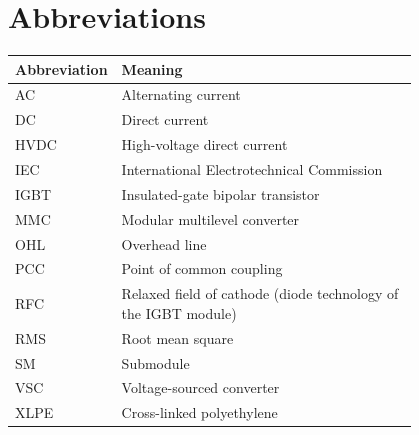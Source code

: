 \section{Abbreviations}
\label{sec:abbreviations}

\begin{longtable}{@{}l p{0.80\linewidth}@{}}
  \toprule
  \multicolumn{1}{c}{\textbf{Abbreviation}} & \textbf{Meaning} \\
  \midrule
  \endhead
  AC    & Alternating current \\
  DC    & Direct current \\
  HVDC  & High-voltage direct current \\
  IEC   & International Electrotechnical Commission \\
  IGBT  & Insulated-gate bipolar transistor \\
  MMC   & Modular multilevel converter \\
  OHL   & Overhead line \\
  PCC   & Point of common coupling \\
  RFC   & Relaxed field of cathode (diode technology of the IGBT module) \\
  RMS   & Root mean square \\
  SM    & Submodule \\
  VSC   & Voltage-sourced converter \\
  XLPE  & Cross-linked polyethylene \\
  \bottomrule
\end{longtable}
